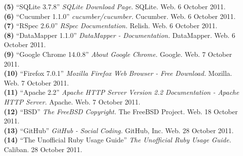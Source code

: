 \documentclass{article}
\begin{document}
\noindent\hangindent=1.4cm
\textbf{(5)} ``SQLite 3.7.8''
\emph{SQLite Download Page.} SQLite. Web.  6 October 2011.\\

\noindent\hangindent=1.4cm
\textbf{(6)} ``Cucumber 1.1.0''
\emph{cucumber/cucumber.} Cucumber. Web.  6 October 2011.\\

\noindent\hangindent=1.4cm
\textbf{(7)} ``RSpec 2.6.0''
\emph{RSpec Documentation.} Relish. Web.  6 October 2011.\\

\noindent\hangindent=1.4cm
\textbf{(8)} ``DataMapper 1.1.0''
\emph{DataMapper - Documentation.} DataMapper. Web.  6 October 2011.\\

\noindent\hangindent=1.4cm
\textbf{(9)} ``Google Chrome 14.0.8'' 
\emph{About Google Chrome.} Google. Web.  7 October 2011.\\

\noindent\hangindent=1.4cm
\textbf{(10)} ``Firefox 7.0.1''
\emph{Mozilla Firefox Web Browser - Free Download.} Mozilla. Web.  7 October 2011.\\

\noindent\hangindent=1.4cm
\textbf{(11)} ``Apache 2.2''
\emph{Apache HTTP Server Version 2.2 Documentation - Apache HTTP Server.} Apache. Web.  7 October 2011.\\

\noindent\hangindent=1.4cm
\textbf{(12)} ``BSD''
\emph{The FreeBSD Copyright.} The FreeBSD Project. Web. 18 October 2011.\\

\noindent\hangindent=1.4cm
\textbf{(13)} ``GitHub''
\emph{GitHub - Social Coding.} GitHub, Inc. Web. 28 October 2011.\\

\noindent\hangindent=1.4cm
\textbf{(14)} ``The Unofficial Ruby Usage Guide'' \emph{The Unofficial Ruby Usage Guide.} Caliban. 28 October 2011.\\
\end{document}
